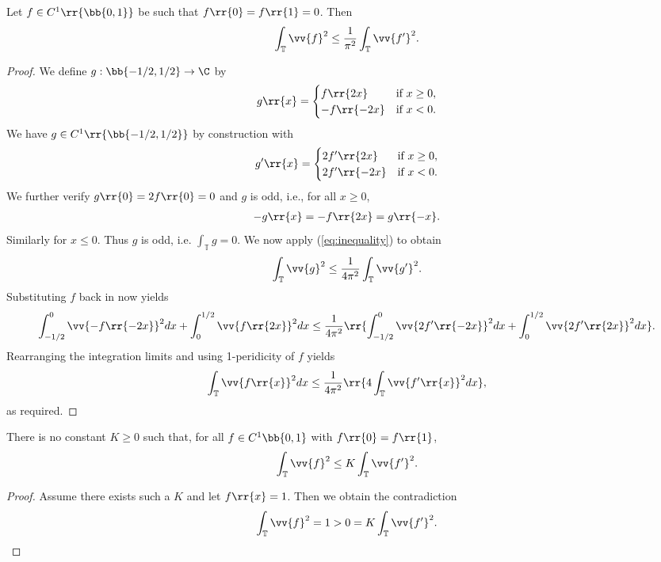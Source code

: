 \documentclass{article}
\begin{document}
\begin{claim*}[2b]
  Let $f\in C^1\rr{\bb{0,1}}$ be such that $f\rr{0}=f\rr{1}=0$. Then
  \begin{align*}
    \int_{\mathbb T} \vv{f}^2 \leq \frac{1}{\pi^2}\int_{\mathbb T}\vv{f'}^2.
  \end{align*}
  \begin{proof}
    We define $g : \bb{-1/2,1/2}\to\C$ by
    \begin{align*}
      g\rr{x}=
      \begin{cases}
        f\rr{2x}   & \text{if }x\geq 0, \\
        -f\rr{-2x} & \text{if }x<0.
      \end{cases}
    \end{align*}
    We have $g\in C^1\rr{\bb{-1/2,1/2}}$ by construction with
    \begin{align*}
      g'\rr{x}=
      \begin{cases}
        2f'\rr{2x} &\text{if }x\geq 0, \\
        2f'\rr{-2x} &\text{if }x<0.
      \end{cases}
    \end{align*}
    We further verify $g\rr{0}=2f\rr{0}=0$ and $g$ is odd, i.e., for all $x\geq 0$,
    \begin{align*}
      -g\rr{x}=-f\rr{2x}=g\rr{-x}.
    \end{align*}
    Similarly for $x\leq 0$. Thus $g$ is odd, i.e. $\int_{\mathbb T} g = 0$. We now
    apply (\ref{eq:inequality}) to obtain
    \begin{align*}
      \int_{\mathbb T}\vv{g}^2 \leq \frac{1}{4\pi^2}\int_{\mathbb T}\vv{g'}^2.
    \end{align*}
    Substituting $f$ back in now yields
    \begin{align*}
      \int_{-1/2}^0\vv{-f\rr{-2x}}^2 dx+ \int_0^{1/2}\vv{f\rr{2x}}^2 dx
      \leq \frac{1}{4\pi^2}\rr{\int_{-1/2}^0\vv{2f'\rr{-2x}}^2 dx
      + \int_0^{1/2}\vv{2f'\rr{2x}}^2dx}.
    \end{align*}
    Rearranging the integration limits and using 1-peridicity of $f$ yields
    \begin{align*}
      \int_{\mathbb T}\vv{f\rr{x}}^2 dx
      \leq \frac{1}{4\pi^2}\rr{4\int_{\mathbb T}\vv{f'\rr{x}}^2 dx},
    \end{align*}
    as required.
  \end{proof}
\end{claim*}

\begin{claim*}[2c]
  There is no constant $K\geq 0$ such that, for all $f\in C^1\bb{0,1}$ with $f\rr{0}=f\rr{1}$,
  \begin{align*}
    \int_{\mathbb T}\vv{f}^2 \leq K\int_{\mathbb T}\vv{f'}^2.
  \end{align*}
  \begin{proof}
    Assume there exists such a $K$ and let $f\rr{x}=1$. Then we obtain the contradiction
    \begin{align*}
      \int_{\mathbb T} \vv{f}^2 = 1 > 0 = K\int_{\mathbb T}\vv{f'}^2.
    \end{align*}
  \end{proof}
\end{claim*}
\end{document}
